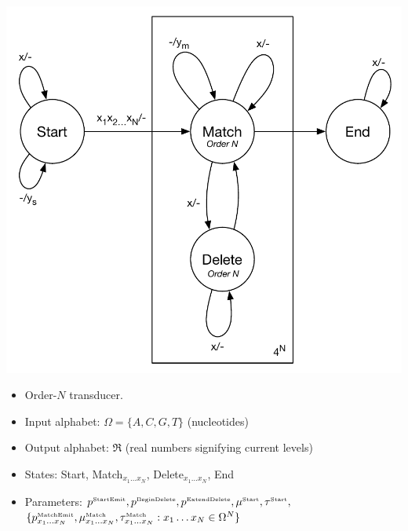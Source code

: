 \documentclass[10pt]{article}
\begin{document}
\includegraphics[width=\textwidth]{figs/Transducer.pdf}

\newcommand\paramlabel[1]{\mbox{\tiny #1}}

\begin{itemize}
\item Order-$N$ transducer.
\item Input alphabet: $\Omega = \{ A, C, G, T \}$ (nucleotides)
\item Output alphabet: $\Re$ (real numbers signifying current levels)
\item States: Start, Match${}_{x_1 \ldots x_N}$, Delete${}_{x_1 \ldots x_N}$, End
\item Parameters:
$p^{\paramlabel{StartEmit}}, p^{\paramlabel{BeginDelete}}, p^{\paramlabel{ExtendDelete}}, \mu^{\paramlabel{Start}},\tau^{\paramlabel{Start}},$ \\
$\{ p^{\paramlabel{MatchEmit}}_{x_1\ldots x_N}, \mu^{\paramlabel{Match}}_{x_1\ldots x_N},\tau^{\paramlabel{Match}}_{x_1\ldots x_N} : x_1 \ldots x_N \in \Omega^N \}$
\end{itemize}
\end{document}

